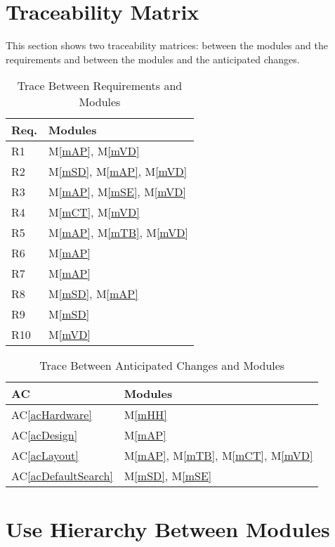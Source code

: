\documentclass[12pt, titlepage]{article}
\newcommand{\acref}[1]{AC\ref{#1}}
\newcommand{\mref}[1]{M\ref{#1}}
\begin{document}
\section{Traceability Matrix} \label{SecTM}

This section shows two traceability matrices: between the modules and the
requirements and between the modules and the anticipated changes.

\begin{table}[H]
\centering
\begin{tabular}{p{} p{}}
\toprule
\textbf{Req.} & \textbf{Modules}\\
\midrule
R1 & \mref{mAP}, \mref{mVD}\\
R2 & \mref{mSD}, \mref{mAP}, \mref{mVD}\\
R3 & \mref{mAP}, \mref{mSE}, \mref{mVD}\\
R4 & \mref{mCT}, \mref{mVD}\\
R5 & \mref{mAP}, \mref{mTB}, \mref{mVD}\\
R6 & \mref{mAP}\\
R7 & \mref{mAP}\\
R8 & \mref{mSD}, \mref{mAP}\\
R9 & \mref{mSD}\\
R10 & \mref{mVD}\\
\bottomrule
\end{tabular}
\caption{Trace Between Requirements and Modules}
\label{TblRT}
\end{table}

\begin{table}[H]
\centering
\begin{tabular}{p{} p{}}
\toprule
\textbf{AC} & \textbf{Modules}\\
\midrule
\acref{acHardware} & \mref{mHH}\\
\acref{acDesign} & \mref{mAP}\\
\acref{acLayout} & \mref{mAP}, \mref{mTB}, \mref{mCT}, \mref{mVD}\\
\acref{acDefaultSearch} & \mref{mSD}, \mref{mSE}\\
\bottomrule
\end{tabular}
\caption{Trace Between Anticipated Changes and Modules}
\label{TblACT}
\end{table}

\section{Use Hierarchy Between Modules} \label{SecUse}
\end{document}
